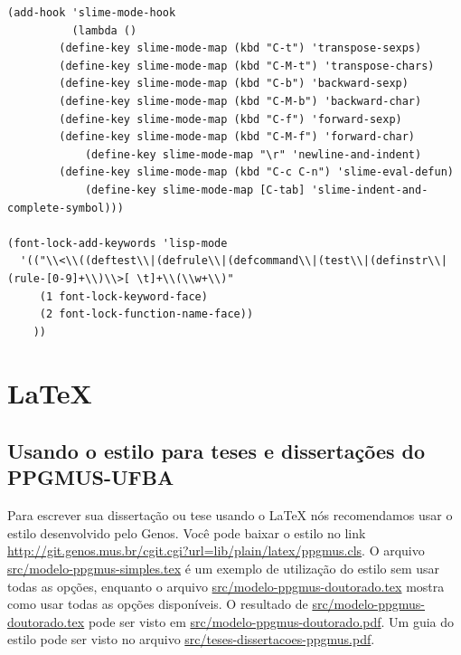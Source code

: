\documentclass[12pt,brazil]{book}
\begin{document}
\begin{verbatim}
(add-hook 'slime-mode-hook 
          (lambda ()
	    (define-key slime-mode-map (kbd "C-t") 'transpose-sexps)
	    (define-key slime-mode-map (kbd "C-M-t") 'transpose-chars)
	    (define-key slime-mode-map (kbd "C-b") 'backward-sexp)
	    (define-key slime-mode-map (kbd "C-M-b") 'backward-char)
	    (define-key slime-mode-map (kbd "C-f") 'forward-sexp)
	    (define-key slime-mode-map (kbd "C-M-f") 'forward-char)
            (define-key slime-mode-map "\r" 'newline-and-indent)
	    (define-key slime-mode-map (kbd "C-c C-n") 'slime-eval-defun)
            (define-key slime-mode-map [C-tab] 'slime-indent-and-complete-symbol)))

(font-lock-add-keywords 'lisp-mode
  '(("\\<\\((deftest\\|(defrule\\|(defcommand\\|(test\\|(definstr\\|(rule-[0-9]+\\)\\>[ \t]+\\(\\w+\\)"
     (1 font-lock-keyword-face)
     (2 font-lock-function-name-face))
    ))
\end{verbatim}


\chapter{LaTeX}
\label{cha:latex}

\section{Usando o estilo para teses e dissertações do PPGMUS-UFBA}
\label{sec:usando-o-estilo}

Para escrever sua dissertação ou tese usando o LaTeX nós recomendamos
usar o estilo desenvolvido pelo Genos. Você pode baixar o estilo no
link
\url{http://git.genos.mus.br/cgit.cgi?url=lib/plain/latex/ppgmus.cls}.
O arquivo \url{src/modelo-ppgmus-simples.tex} é um exemplo de
utilização do estilo sem usar todas as opções, enquanto o arquivo
\url{src/modelo-ppgmus-doutorado.tex} mostra como usar todas as opções
disponíveis. O resultado de \url{src/modelo-ppgmus-doutorado.tex} pode ser
visto em \url{src/modelo-ppgmus-doutorado.pdf}. Um guia do estilo pode
ser visto no arquivo \url{src/teses-dissertacoes-ppgmus.pdf}.
\end{document}
